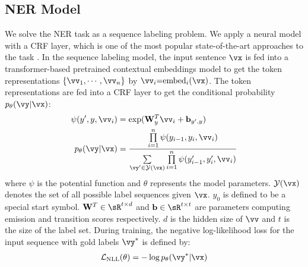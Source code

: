 \documentclass[11pt,a4paper]{article}
\newcommand{\mcL}{\mathcal{L}}
\newcommand{\Wvec}{\mathbf{W}}
\newcommand{\bvec}{\mathbf{b}}
\begin{document}
\subsection{NER Model}
We solve the NER task as a sequence labeling problem. We apply a neural model with a CRF layer, which is one of the most popular state-of-the-art approaches to the task \citep{lample-etal-2016-neural,ma-hovy-2016-end,akbik-etal-2019-pooled}. In the sequence labeling model, the input sentence $\vx$ is fed into a transformer-based pretrained contextual embeddings model to get the token representations $\{\vv_1, \cdots, \vv_n\}$ by $\vv_i {=} \text{embed}_i (\vx)$.
The token representations are fed into a CRF layer to get the conditional probability $p_\theta(\vy|\vx)$:
\begin{align}
    \psi(y', y, \vv_i) &= \exp(\Wvec_{y}^{T} \vv_i + \bvec_{y',y}) \label{eq:psi}\\
    p_\theta(\vy|\vx) &= \frac{\prod\limits_{i=1}^{n} \psi(y_{i-1}, y_i, \vv_i)}{\sum\limits_{\vy' \in \mathcal{Y}(\vx)} \prod\limits_{i=1}^{n} \psi(y'_{i-1}, y'_i, \vv_i)}\nonumber
\end{align}
where $\psi$ is the potential function and $\theta$ represents the model parameters. $\mathcal{Y}(\vx)$ denotes the set of all possible label sequences given $\vx$. $y_0$ is defined to be a special start symbol. $\Wvec^{T}\in \sR^{t\times d}$ and $\bvec \in \sR^{t \times t}$ are parameters computing emission and transition scores respectively. $d$ is the hidden size of $\vv$ and $t$ is the size of the label set. During training, the negative log-likelihood loss for the input sequence with gold labels $\vy^*$ is defined by:
\begin{align}
\mcL_{\text{NLL}}(\theta) = - \log p_\theta(\vy^*|\vx) \label{eq:nll_loss}
\end{align}
\end{document}
